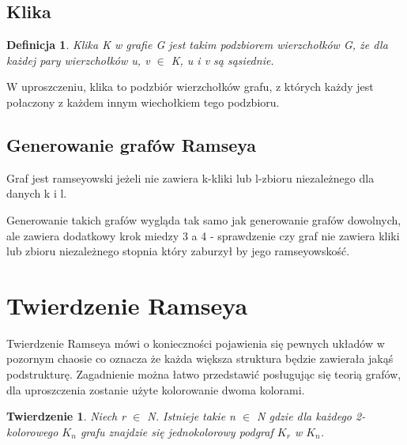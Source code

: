 \documentclass[11pt]{article}
\newtheorem{theorem}{Twierdzenie}
\newtheorem{definition}{Definicja}[section]
\begin{document}
\subsection{Klika}
\begin{definition}
 Klika K w grafie G jest takim podzbiorem wierzchołków G, że dla każdej pary wierzchołków u, v $\in$ K, u i v są sąsiednie. 
\end{definition}

W uproszczeniu, klika to podzbiór wierzchołków grafu, z których każdy jest połaczony z każdem innym wiechołkiem tego podzbioru.


   \subsection{Generowanie grafów Ramseya}
   Graf jest ramseyowski jeżeli nie zawiera k-kliki lub l-zbioru niezależnego dla danych k i l. 

   Generowanie takich grafów wygląda tak samo jak generowanie grafów dowolnych, ale zawiera dodatkowy krok miedzy 3 a 4 - sprawdzenie czy graf nie zawiera kliki lub zbioru niezależnego stopnia który zaburzył by jego ramseyowskość.  

\section{Twierdzenie Ramseya}

Twierdzenie Ramseya mówi o konieczności pojawienia się pewnych układów w pozornym chaosie co oznacza że każda większa struktura będzie zawierała jakąś podstrukturę. Zagadnienie można łatwo przedstawić posługując się teorią grafów, dla uproszczenia zostanie użyte kolorowanie dwoma kolorami.

\begin{theorem}
Niech r $\in$ N. Istnieje takie n $\in$ N gdzie dla każdego 2-kolorowego $\mathit{K}_{n}$ grafu znajdzie się jednokolorowy podgraf $\mathit{K}_{r}$ w $\mathit{K}_{n}$.
\end{theorem}
\end{document}
